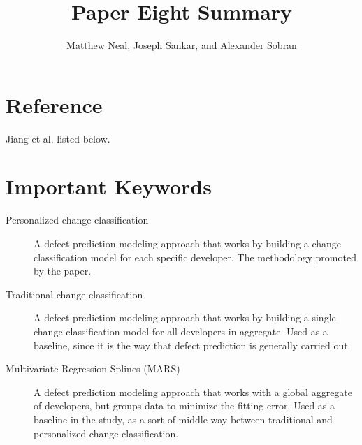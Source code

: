 \documentclass[english]{article}
\begin{document}
\title{Paper Eight Summary}


\author{Matthew Neal, Joseph Sankar, and Alexander Sobran}

\maketitle

\section*{Reference}

Jiang et al. \cite{Jiang} listed below.


\section*{Important Keywords}
\begin{description}
\item [{Personalized change classification}] A defect prediction modeling approach that works by building a change classification model for each specific developer.  The methodology promoted by the paper.
\item[{Traditional change classification}] A defect prediction modeling approach that works by building a single change classification model for all developers in aggregate.  Used as a baseline, since it is the way that defect prediction is generally carried out.
\item[{Multivariate Regression Splines (MARS)}] A defect prediction modeling approach that works with a global aggregate of developers, but groups data to minimize the fitting error.   Used as a baseline in the study, as a sort of middle way between traditional and personalized change classification.

\end{description}
\end{document}
